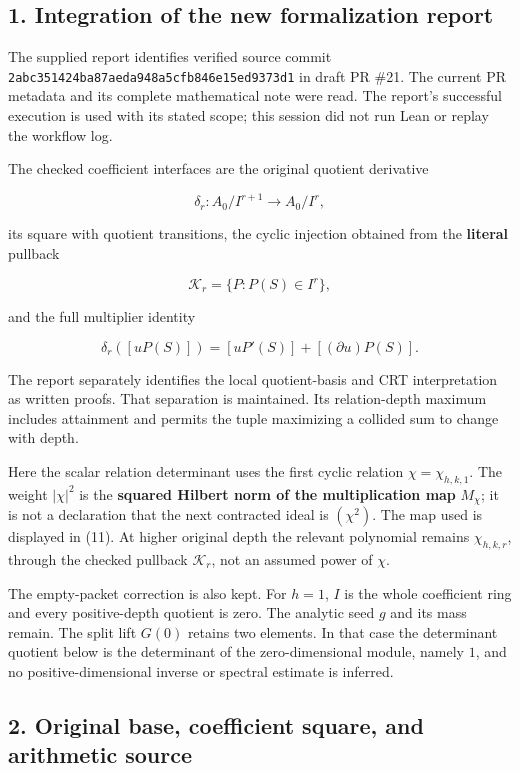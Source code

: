 \subsection{1. Integration of the new formalization
report}\label{toda_volume:integration-of-the-new-formalization-report}

The supplied report identifies verified source commit
\nolinkurl{2abc351424ba87aeda948a5cfb846e15ed9373d1} in draft PR \#21. The
current PR metadata and its complete mathematical note were read. The
report's successful execution is used with its stated scope; this
session did not run Lean or replay the workflow log.

The checked coefficient interfaces are the original quotient derivative

\[
\delta_r:A_0/I^{r+1}\longrightarrow A_0/I^r,
\]

its square with quotient transitions, the cyclic injection obtained from
the \textbf{literal} pullback

\[
\mathcal K_r=\{P:P(S)\in I^r\},
\]

and the full multiplier identity

\[
\delta_r([uP(S)])=[uP'(S)]+[(\partial u)P(S)].
\]

The report separately identifies the local quotient-basis and CRT
interpretation as written proofs. That separation is maintained. Its
relation-depth maximum includes attainment and permits the tuple
maximizing a collided sum to change with depth.

Here the scalar relation determinant uses the first cyclic relation
\(\chi=\chi_{h,k,1}\). The weight \(|\chi|^2\) is the \textbf{squared
Hilbert norm of the multiplication map} \(M_\chi\); it is not a
declaration that the next contracted ideal is \((\chi^2)\). The map used
is displayed in (11). At higher original depth the relevant polynomial
remains \(\chi_{h,k,r}\), through the checked pullback \(\mathcal K_r\),
not an assumed power of \(\chi\).

The empty-packet correction is also kept. For \(h=1\), \(I\) is the
whole coefficient ring and every positive-depth quotient is zero. The
analytic seed \(g\) and its mass remain. The split lift \(G(0)\) retains
two elements. In that case the determinant quotient below is the
determinant of the zero-dimensional module, namely \(1\), and no
positive-dimensional inverse or spectral estimate is inferred.

\subsection{2. Original base, coefficient square, and arithmetic
source}\label{toda_volume:original-base-coefficient-square-and-arithmetic-source}

